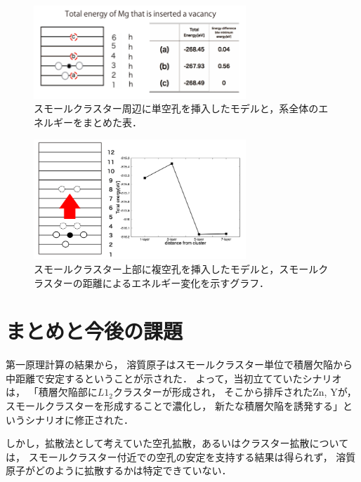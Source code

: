 \documentclass[a4j,twocolumn]{jsarticle}
\begin{document}
\begin{figure}[H]
\begin{center}
   \includegraphics[width=80mm]{./vacancy.png}
  \caption{スモールクラスター周辺に単空孔を挿入したモデルと，系全体のエネルギーをまとめた表．}
  \label{fig:five}
\end{center}
\end{figure}

\begin{figure}[H]
\vspace{-1.0\baselineskip}
\begin{center}
   \includegraphics[width=80mm]{./double_vacancy.png}
  \caption{スモールクラスター上部に複空孔を挿入したモデルと，スモールクラスターの距離によるエネルギー変化を示すグラフ．}
  \label{fig:six}
\end{center}
\end{figure}

\vspace{-1.4\baselineskip}

\section{まとめと今後の課題}
第一原理計算の結果から，
溶質原子はスモールクラスター単位で積層欠陥から中距離で安定するということが示された．
よって，当初立てていたシナリオは，
「積層欠陥部に$L1_2$クラスターが形成され，
そこから排斥されたZn, Yが，スモールクラスターを形成することで濃化し，
新たな積層欠陥を誘発する」というシナリオに修正された．

しかし，拡散法として考えていた空孔拡散，あるいはクラスター拡散については，
スモールクラスター付近での空孔の安定を支持する結果は得られず，
溶質原子がどのように拡散するかは特定できていない．
\end{document}
